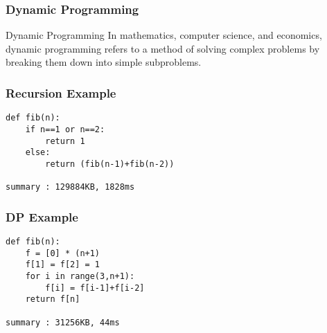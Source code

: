 \documentclass{beamer}
\begin{document}
\begin{frame}
\frametitle{Dynamic Programming}


\begin{block}{Dynamic Programming}
In mathematics, computer science, and economics, dynamic programming refers to a method of solving complex problems by breaking them down into simple subproblems.
\end{block}
\end{frame}

\begin{frame}[fragile] %
\frametitle{Recursion Example}
\begin{example}
\begin{verbatim}
def fib(n):
    if n==1 or n==2:
        return 1
    else:
        return (fib(n-1)+fib(n-2))

summary : 129884KB, 1828ms
\end{verbatim}
\end{example}
\end{frame}


\begin{frame}[fragile] %
\frametitle{DP Example}
\begin{example}
\begin{verbatim}
def fib(n):
    f = [0] * (n+1)
    f[1] = f[2] = 1
    for i in range(3,n+1):
        f[i] = f[i-1]+f[i-2]
    return f[n]

summary : 31256KB, 44ms
\end{verbatim}
\end{example}
\end{frame}
\end{document}
